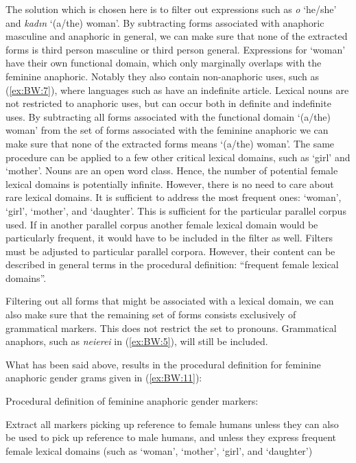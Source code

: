\documentclass[output=collectionpaper]{langsci/langscibook}
\begin{document}
The solution which is chosen here is to filter out expressions such as  \textit{o} ‘he/she’ and \textit{kadın} ‘(a/the) woman’. By subtracting forms associated with anaphoric masculine and anaphoric in general, we can make sure that none of the extracted forms is third person masculine or third person general. Expressions for ‘woman’ have their own functional domain, which only marginally overlaps with the feminine anaphoric. Notably they also contain non-anaphoric uses, such as (\ref{ex:BW:7}), where languages such as  have an indefinite article. Lexical nouns are not restricted to anaphoric uses, but can occur both in definite and indefinite uses. By subtracting all forms associated with the functional domain ‘(a/the) woman’ from the set of forms associated with the feminine anaphoric we can make sure that none of the extracted forms means ‘(a/the) woman’. The same procedure can be applied to a few other critical lexical domains, such as ‘girl’ and ‘mother’. Nouns are an open word class. Hence, the number of potential female lexical domains is potentially infinite. However, there is no need to care about rare lexical domains. It is sufficient to address the most frequent ones: ‘woman’, ‘girl’, ‘mother’, and ‘daughter’. This is sufficient for the particular parallel corpus used. If in another parallel corpus another female lexical domain would be particularly frequent, it would have to be included in the filter as well. Filters must be adjusted to particular parallel corpora. However, their content can be described in general terms in the procedural definition: “frequent female lexical domains”.

Filtering out all forms that might be associated with a lexical domain, we can also make sure that the remaining set of forms consists exclusively of grammatical markers. This does not restrict the set to pronouns. Grammatical anaphors, such as \textit{neierei} in  (\ref{ex:BW:5}), will still be included.

What has been said above, results in the procedural definition for feminine anaphoric gender grams given in (\ref{ex:BW:11}):

\ea\label{ex:BW:11}
Procedural definition of feminine anaphoric gender markers:\\
\begin{xlist}
\ex Extract all markers picking up reference to female humans
\ex unless they can also be used to pick up reference to male humans, and
\ex unless they express frequent female lexical domains (such as ‘woman’, ‘mother’, ‘girl’, and ‘daughter’)
\end{xlist}
\z
\end{document}

